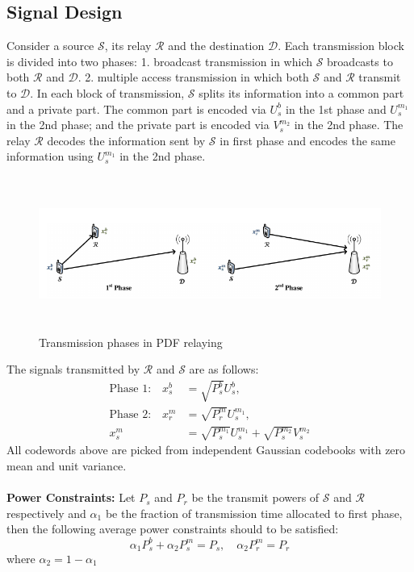\subsection{Signal Design}
Consider a source $\mathcal{S}$, its relay $\mathcal{R}$ and the destination $\mathcal{D}$. Each transmission block is divided into two phases: 1. broadcast transmission in which $\mathcal{S}$ broadcasts to both $\mathcal{R}$ and $\mathcal{D}$. 2. multiple access transmission in which both $\mathcal{S}$ and $\mathcal{R}$ transmit to $\mathcal{D}$. In each block of transmission, $\mathcal{S}$ splits its information into a common part and a private part. The common part is encoded via $U_s^b$ in the 1st phase and $U_s^{m_1}$ in the 2nd phase; and the private part is encoded via $V_s^{m_2}$ in the 2nd phase. The relay $\mathcal{R}$ decodes the information sent by $\mathcal{S}$ in first phase and encodes the same information using $U_s^{m_1}$ in the 2nd phase. \\ 
\begin{figure}[H]
\begin{center}
\includegraphics[height = 2in,width=5in,angle=00]{images/pdfRelaying.png}
\caption{\small Transmission phases in PDF relaying}
\label{fig:sysModel}
\end{center}
\end{figure}
The signals transmitted by $\mathcal{R}$ and $\mathcal{S}$ are as follows:
\begin{align}
\text{Phase 1:}\quad x^b_s &= \sqrt{P_s^b} U_s^b, \label{eq:tranSig1}\\
\text{Phase 2:}\quad x_r^m &= \sqrt{P_r^m}U_s^{m_1}, \label{eq:tranSig2}\\ 
 x^m_s &= \sqrt{P_s^{m_1}}U_s^{m_1} + \sqrt{P_s^{m_2}}V_s^{m_2} \label{eq:tranSig3}
\end{align}
All codewords above are picked from independent Gaussian codebooks with zero mean and unit variance. \\ \\
\textbf{Power Constraints:} Let $P_s$ and $P_r$ be the transmit powers of $\mathcal{S}$ and $\mathcal{R}$ respectively and $\alpha_1$ be the fraction of transmission time allocated to first phase, then the following average power constraints should to be satisfied:
\begin{equation}
\alpha_1 P_s^b + \alpha_2 P_s^m = P_s,\quad \alpha_2P_r^m = P_r
\end{equation}
where $\alpha_2 = 1-\alpha_1$

